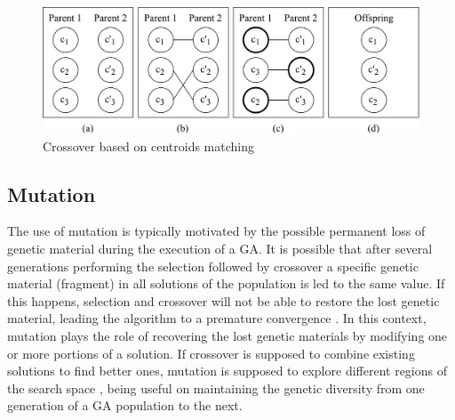 \begin{figure}[H]
  \begin{center}
    \includegraphics[width=1.0\textwidth]{img/crossover}
    \caption{Crossover based on centroids matching}\label{fig:crossover}
  \end{center}
\end{figure}




\subsection{Mutation}
\label{subsec:mutation}
The use of mutation is typically motivated by the possible permanent loss of genetic material during the execution of a GA. It is possible that after several generations performing the selection followed by crossover a specific genetic material (fragment) in all solutions of the population is led to the same value. If this happens, selection and crossover will not be able to restore the lost genetic material, leading the algorithm to a premature convergence \cite{Whitley1994}. In this context, mutation plays the role of recovering the lost genetic materials by modifying one or more portions of a solution. If crossover is supposed to combine existing solutions to find better ones, mutation is supposed to explore different regions of the search space \cite{Abdoun2012}, being useful on maintaining the genetic diversity from one generation of a GA population to the next.

